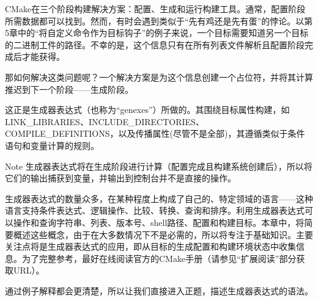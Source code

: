 

CMake在三个阶段构建解决方案：配置、生成和运行构建工具。通常，配置阶段所需数据都可以找到。然而，有时会遇到类似于“先有鸡还是先有蛋”的悖论。以第5章中的“将自定义命令作为目标钩子”的例子来说，一个目标需要知道另一个目标的二进制工件的路径。不幸的是，这个信息只有在所有列表文件解析且配置阶段完成后才能获得。

那如何解决这类问题呢？一个解决方案是为这个信息创建一个占位符，并将其计算推迟到下一个阶段——生成阶段。

这正是生成器表达式（也称为“genexes”）所做的。其围绕目标属性构建，如LINK\_LIBRARIES、INCLUDE\_DIRECTORIES、COMPILE\_DEFINITIONS，以及传播属性(尽管不是全部)，其遵循类似于条件语句和变量计算的规则。

\begin{myNotic}{Note}
生成器表达式将在生成阶段进行计算（配置完成且构建系统创建后），所以将它们的输出捕获到变量，并输出到控制台并不是直接的操作。
\end{myNotic}

生成器表达式的数量众多，在某种程度上构成了自己的、特定领域的语言——这种语言支持条件表达式、逻辑操作、比较、转换、查询和排序。利用生成器表达式可以操作和查询字符串、列表、版本号、shell路径、配置和构建目标。本章中，将简要概述这些概念，由于在大多数情况下不是必需的，所以将专注于基础知识。主要关注点将是生成器表达式的应用，即从目标的生成配置和构建环境状态中收集信息。为了完整参考，最好在线阅读官方的CMake手册（请参见“扩展阅读”部分获取URL）。

通过例子解释都会更清楚，所以让我们直接进入正题，描述生成器表达式的语法。















